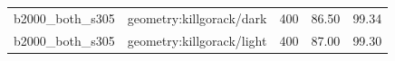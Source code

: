 \begin{longtable}{l>{\raggedright\arraybackslash}p{.42\linewidth}rrr}
b2000\_\allowbreak{}both\_\allowbreak{}s305 & %
geometry:killgorack/dark & %
400 & %
86.50 & %
99.34 \\ %

b2000\_\allowbreak{}both\_\allowbreak{}s305 & %
geometry:killgorack/light & %
400 & %
87.00 & %
99.30 \\ %


\end{longtable}
